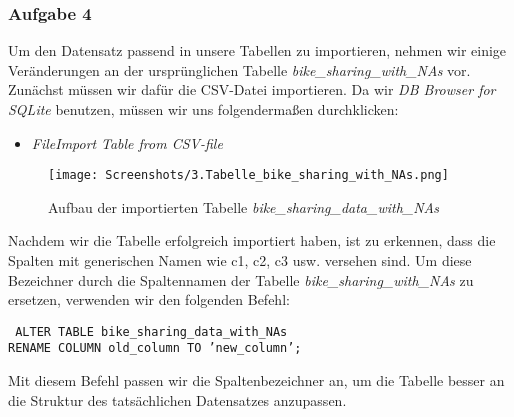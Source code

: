 \documentclass[a4paper, 12pt]{article}
\begin{document}
\subsubsection{Aufgabe 4}
{\fontsize{12}{15}\selectfont
Um den Datensatz passend in unsere Tabellen zu importieren, nehmen wir einige Veränderungen an der ursprünglichen Tabelle \textit{bike\_sharing\_with\_NAs} vor. Zunächst müssen wir dafür die CSV-Datei importieren. Da wir \textit{DB Browser for SQLite} benutzen, müssen wir uns folgendermaßen durchklicken:

\vspace{\baselineskip} 

\begin{itemize}
    \item \textit{File}\rightarrow \textit{Import} \rightarrow \textit{Table from CSV-file}
\end{itemize} 

\vspace{\baselineskip} 

\begin{figure}[ht]
    \centering
      \texttt{[image: Screenshots/3.Tabelle\_bike\_sharing\_with\_NAs.png]}
        \par Aufbau der importierten Tabelle \textit{bike\_sharing\_data\_with\_NAs} 
\end{figure}


\vspace{\baselineskip} 

Nachdem wir die Tabelle erfolgreich importiert haben, ist zu erkennen, dass die Spalten mit generischen Namen wie c1, c2, c3 usw. versehen sind. Um diese Bezeichner durch die Spaltennamen der Tabelle \textit{bike\_sharing\_with\_NAs} zu ersetzen, verwenden wir den folgenden Befehl:

\vspace{\baselineskip}

{\fontsize{10}{12}\selectfont
\texttt{%
ALTER TABLE bike\_sharing\_data\_with\_NAs \\ RENAME COLUMN old\_column TO 'new\_column';} 
}

\vspace{\baselineskip}

Mit diesem Befehl passen wir die Spaltenbezeichner an, um die Tabelle besser an die Struktur des tatsächlichen Datensatzes anzupassen.}
\end{document}
